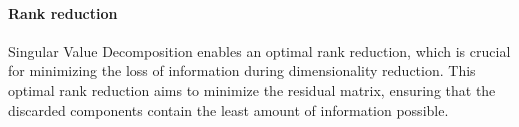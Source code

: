 \paragraph*{Rank reduction}
Singular Value Decomposition enables an optimal rank reduction, which is crucial for minimizing the loss of information during dimensionality reduction. 
This optimal rank reduction aims to minimize the residual matrix, ensuring that the discarded components contain the least amount of information possible.